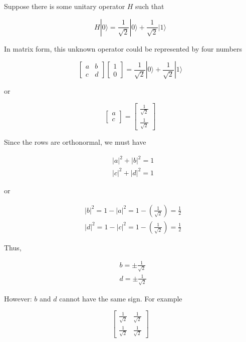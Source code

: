 \documentclass[main.tex]{subfiles}
\begin{document}
    Suppose there is some unitary operator $H$ such that
    
    $$
    H|0\rangle=\frac{1}{\sqrt{2}}|0\rangle+\frac{1}{\sqrt{2}}|1\rangle
    $$
    
    In matrix form, this unknown operator could be represented by four numbers
    
    $$
    \left[\begin{array}{ll}
    a & b \\
    c & d
    \end{array}\right]\left[\begin{array}{l}
    1 \\
    0
    \end{array}\right]=\frac{1}{\sqrt{2}}|0\rangle+\frac{1}{\sqrt{2}}|1\rangle
    $$
    
    or
    
    $$
    \left[\begin{array}{l}
    a \\
    c
    \end{array}\right]=\left[\begin{array}{c}
    \frac{1}{\sqrt{2}} \\
    \frac{1}{\sqrt{2}}
    \end{array}\right]
    $$
    
    Since the rows are orthonormal, we must have
    
    $$
    \begin{aligned}
    &|a|^{2}+|b|^{2}=1 \\
    &|c|^{2}+|d|^{2}=1
    \end{aligned}
    $$
    
    or
    
    $$
    \begin{aligned}
    &|b|^{2}=1-|a|^{2}=1-\left(\frac{1}{\sqrt{2}}\right)=\frac{1}{2} \\
    &|d|^{2}=1-|c|^{2}=1-\left(\frac{1}{\sqrt{2}}\right)=\frac{1}{2}
    \end{aligned}
    $$
    
    Thus,
    
    $$
    \begin{aligned}
    &b=\pm \frac{1}{\sqrt{2}} \\
    &d=\pm \frac{1}{\sqrt{2}}
    \end{aligned}
    $$
    
    However: $b$ and $d$ cannot have the same sign. For example
    
    $$
    \left[\begin{array}{ll}
    \frac{1}{\sqrt{2}} & \frac{1}{\sqrt{2}} \\
    \frac{1}{\sqrt{2}} & \frac{1}{\sqrt{2}}
    \end{array}\right]
    $$
    
\end{document}
